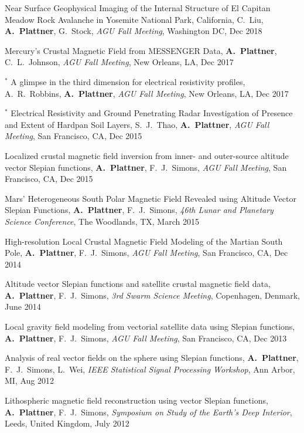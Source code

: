 \documentclass[10pt]{article}
\begin{document}
\spcp
\hspace*{-0.4cm} \gr \hspace*{-0.05cm} Near Surface Geophysical Imaging of the Internal
Structure of El Capitan Meadow Rock Avalanche in Yosemite National
Park, California,
C.~Liu, \textbf{A.~Plattner}, G.~Stock,
\emph{AGU Fall Meeting}, Washington DC, Dec 2018


\spcp
Mercury's Crustal Magnetic Field from MESSENGER Data,
 \textbf{A.~Plattner}, C.~L.~Johnson, 
\emph{AGU Fall Meeting}, New Orleans, LA, Dec 2017 

\spcp
\hspace{-0.4cm} $^*$ A glimpse in the third dimension for electrical
resistivity profiles,
A.~R.~Robbins, \textbf{A.~Plattner},
\emph{AGU Fall Meeting}, New Orleans, LA, Dec 2017 

\spcp
\hspace{-0.4cm} $^*$ Electrical Resistivity and Ground Penetrating Radar 
Investigation of Presence and Extent of Hardpan Soil Layers,
 S.~J.~Thao, \textbf{A.~Plattner},
\emph{AGU Fall Meeting}, San Francisco, CA, Dec 2015

\spcp
Localized crustal magnetic field inversion from inner- and outer-source altitude vector Slepian functions, \textbf{A.~Plattner},  F.~J.~Simons,
\emph{AGU Fall Meeting}, San Francisco, CA, Dec 2015


\spcp
Mars' Heterogeneous South Polar Magnetic Field Revealed using Altitude Vector Slepian Functions,
\textbf{A.~Plattner},  F.~J.~Simons,
\emph{46th Lunar and Planetary Science Conference}, The Woodlands, TX, March 2015


\spcp
High-resolution Local Crustal Magnetic Field Modeling of the Martian South Pole,
\textbf{A.~Plattner},  F.~J.~Simons,
\emph{AGU Fall Meeting}, San Francisco, CA, Dec 2014

\spcp
Altitude vector Slepian functions and satellite crustal magnetic field data,
\textbf{A.~Plattner},  F.~J.~Simons,
\emph{3rd Swarm Science Meeting}, Copenhagen, Denmark, June 2014

\spcp
Local gravity field modeling from vectorial satellite data using Slepian functions,
\textbf{A.~Plattner},  F.~J.~Simons,
\emph{AGU Fall Meeting}, San Francisco, CA, Dec 2013

\spcp
Analysis of real vector fields on the sphere using Slepian functions,
\textbf{A.~Plattner}, F.~J.~Simons, L.~Wei,
\emph{IEEE Statistical Signal Processing Workshop}, Ann Arbor, MI, Aug 2012

\spcp
Lithospheric magnetic field reconstruction using vector Slepian functions,
\textbf{A.~Plattner}, F.~J.~Simons,
\emph{Symposium on Study of the Earth's Deep Interior}, Leeds, United Kingdom, July 2012
\end{document}
